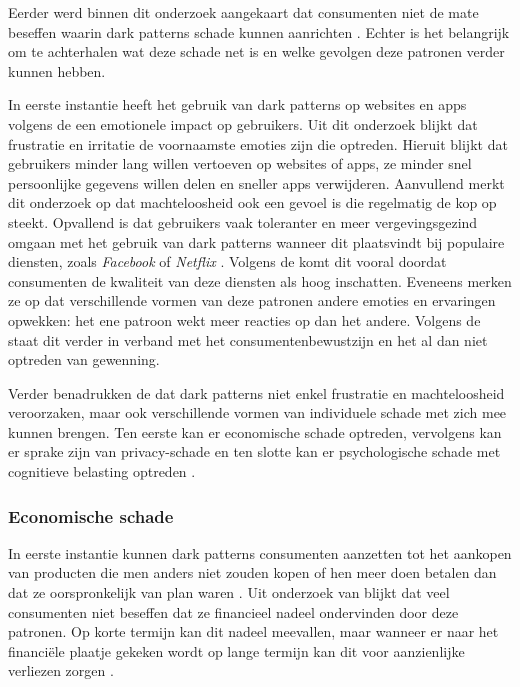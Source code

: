 \vspace{1em}

Eerder werd binnen dit onderzoek aangekaart dat consumenten niet de mate beseffen waarin dark patterns schade kunnen aanrichten \autocite{BongardBlanchy2021}. Echter is het belangrijk om te achterhalen wat deze schade net is en welke gevolgen deze patronen verder kunnen hebben.

\vspace{1em}

In eerste instantie heeft het gebruik van dark patterns op websites en apps volgens de \textcite{Commissie2022} een emotionele impact op gebruikers. Uit dit onderzoek blijkt dat frustratie en irritatie de voornaamste emoties zijn die optreden. Hieruit blijkt dat gebruikers minder lang willen vertoeven op websites of apps, ze minder snel persoonlijke gegevens willen delen en sneller apps verwijderen. Aanvullend merkt dit onderzoek op dat machteloosheid ook een gevoel is die regelmatig de kop op steekt. Opvallend is dat gebruikers vaak toleranter en meer vergevingsgezind omgaan met het gebruik van dark patterns wanneer dit plaatsvindt bij populaire diensten, zoals \textit{Facebook} of \textit{Netflix} \autocite{Commissie2022}. Volgens de \textcite{Commissie2022} komt dit vooral doordat consumenten de kwaliteit van deze diensten als hoog inschatten. Eveneens merken ze op dat verschillende vormen van deze patronen andere emoties en ervaringen opwekken: het ene patroon wekt meer reacties op dan het andere. Volgens de \textcite{Commissie2022} staat dit verder in verband met het consumentenbewustzijn en het al dan niet optreden van gewenning.

\vspace{1em}

Verder benadrukken de \textcite{OECD2022, Commissie2022} dat dark patterns niet enkel frustratie en machteloosheid veroorzaken, maar ook verschillende vormen van individuele schade met zich mee kunnen brengen. Ten eerste kan er economische schade optreden, vervolgens kan er sprake zijn van privacy-schade en ten slotte kan er psychologische schade met cognitieve belasting optreden \autocite{Commissie2022, OECD2022}.

\vspace{1em}

\subsubsection{Economische schade} 
In eerste instantie kunnen dark patterns consumenten aanzetten tot het aankopen van producten die men anders niet zouden kopen of hen meer doen betalen dan dat ze oorspronkelijk van plan waren \autocite{Commissie2022, OECD2022}. Uit onderzoek van \textcite{OECD2022} blijkt dat veel consumenten niet beseffen dat ze financieel nadeel ondervinden door deze patronen. Op korte termijn kan dit nadeel meevallen, maar wanneer er naar het financiële plaatje gekeken wordt op lange termijn kan dit voor aanzienlijke verliezen zorgen \autocite{OECD2022}. 

